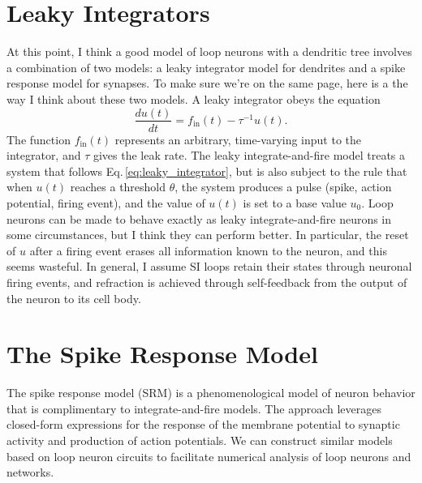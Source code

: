 \documentclass[]{article}
\begin{document}
\section{\label{sec:leaky_integrators}Leaky Integrators}
At this point, I think a good model of loop neurons with a dendritic tree involves a combination of two models: a leaky integrator model for dendrites and a spike response model for synapses. To make sure we're on the same page, here is a the way I think about these two models. A leaky integrator obeys the equation
\begin{equation}
\label{eq:leaky_integrator}
\frac{du(t)}{dt} = f_{\mathrm{in}}(t)-\tau^{-1}u(t).
\end{equation}
The function $f_{\mathrm{in}}(t)$ represents an arbitrary, time-varying input to the integrator, and $\tau$ gives the leak rate. The leaky integrate-and-fire model treats a system that follows Eq.\,\ref{eq:leaky_integrator}, but is also subject to the rule that when $u(t)$ reaches a threshold $\theta$, the system produces a pulse (spike, action potential, firing event), and the value of $u(t)$ is set to a base value $u_0$. Loop neurons can be made to behave exactly as leaky integrate-and-fire neurons in some circumstances, but I think they can perform better. In particular, the reset of $u$ after a firing event erases all information known to the neuron, and this seems wasteful. In general, I assume SI loops retain their states through neuronal firing events, and refraction is achieved through self-feedback from the output of the neuron to its cell body.  

\section{\label{sec:spike_response_model}The Spike Response Model}
The spike response model (SRM) is a phenomenological model of neuron behavior that is complimentary to integrate-and-fire models. The approach leverages closed-form expressions for the response of the membrane potential to synaptic activity and production of action potentials. We can construct similar models based on loop neuron circuits to facilitate numerical analysis of loop neurons and networks.
\end{document}
